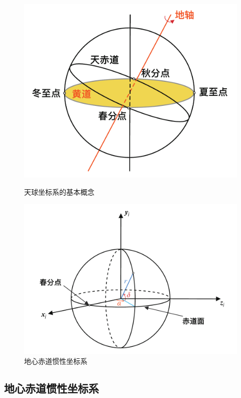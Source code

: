 \begin{figure}[!htb]
	\begin{minipage}{0.45\linewidth}
		\centering
		\includegraphics[width=\linewidth]{pic/基本概念}
		\caption{天球坐标系的基本概念}
		\label{基本概念}
	\end{minipage}
	\begin{minipage}{0.55\linewidth}
		\centering
		\includegraphics[width=\linewidth]{pic/地惯}
		\vspace*{-2.95em}
		\caption{地心赤道惯性坐标系}
		\label{地惯}
	\end{minipage}
\end{figure}


\subsection{地心赤道惯性坐标系}
\vspace*{-1em}

